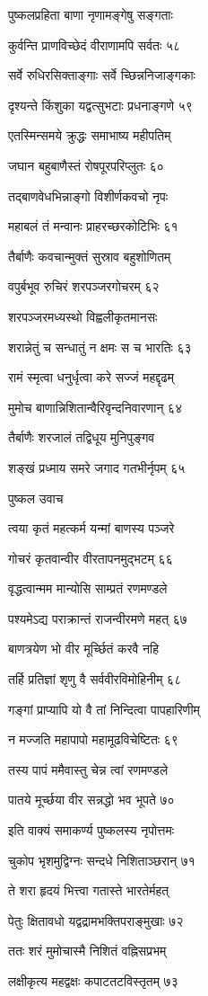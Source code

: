 पुष्कलप्रहिता बाणा नृणामङ्गेषु सङ्गताः

कुर्वन्ति प्राणविच्छेदं वीराणामपि सर्वतः ५८

सर्वे रुधिरसिक्ताङ्गाः सर्वे च्छिन्ननिजाङ्गकाः

दृश्यन्ते किंशुका यद्वत्सुभटाः प्रधनाङ्गणे ५९

एतस्मिन्समये क्रुद्धः समाभाष्य महीपतिम्

जघान बहुबाणैस्तं रोषपूरपरिप्लुतः ६०

तद्बाणवेधभिन्नाङ्गो विशीर्णकवचो नृपः

महाबलं तं मन्वानः प्राहरच्छरकोटिभिः ६१

तैर्बाणैः कवचान्मुक्तं सुस्राव बहुशोणितम्

वपुर्बभूव रुचिरं शरपञ्जरगोचरम् ६२

शरपञ्जरमध्यस्थो विह्वलीकृतमानसः

शरान्नेतुं च सन्धातुं न क्षमः स च भारतिः ६३

रामं स्मृत्वा धनुर्धृत्वा करे सज्जं महद्दृढम्

मुमोच बाणान्निशितान्वैरिवृन्दनिवारणान् ६४

तैर्बाणैः शरजालं तद्विधूय मुनिपुङ्गव

शङ्खं प्रध्माय समरे जगाद गतभीर्नृपम् ६५

पुष्कल उवाच

त्वया कृतं महत्कर्म यन्मां बाणस्य पञ्जरे

गोचरं कृतवान्वीर वीरतापनमुद्भटम् ६६

वृद्धत्वान्मम मान्योसि साम्प्रतं रणमण्डले

पश्यमेऽद्य पराक्रान्तं राजन्वीरमणे महत् ६७

बाणत्रयेण भो वीर मूर्च्छितं करवै नहि

तर्हि प्रतिज्ञां शृणु वै सर्ववीरविमोहिनीम् ६८

गङ्गां प्राप्यापि यो वै तां निन्दित्वा पापहारिणीम्

न मज्जति महापापो महामूढविचेष्टितः ६९

तस्य पापं ममैवास्तु चेन्न त्वां रणमण्डले

पातये मूर्च्छया वीर सन्नद्धो भव भूपते ७०

इति वाक्यं समाकर्ण्य पुष्कलस्य नृपोत्तमः

चुकोप भृशमुद्विग्नः सन्दधे निशिताञ्छरान् ७१

ते शरा हृदयं भित्त्वा गतास्ते भारतेर्महत्

पेतुः क्षितावधो यद्वद्रामभक्तिपराङ्मुखाः ७२

ततः शरं मुमोचास्मै निशितं वह्निसप्रभम्

लक्षीकृत्य महद्वक्षः कपाटतटविस्तृतम् ७३

